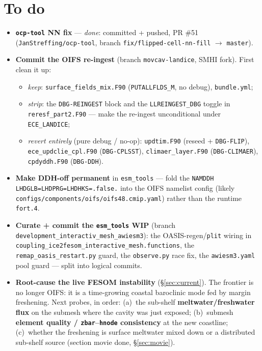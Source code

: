 \documentclass[11pt,a4paper]{article}
\newcommand{\code}[1]{\texttt{\small #1}}
\newcommand{\file}[1]{\texttt{\footnotesize #1}}
\begin{document}
\section{To do}
\begin{itemize}[leftmargin=1.4em,itemsep=2pt]
  \item[$\square$] \textbf{\code{ocp-tool} NN fix} --- \emph{done}: committed + pushed,
        PR \#51 (\code{JanStreffing/ocp-tool}, branch \code{fix/flipped-cell-nn-fill}
        $\to$ \code{master}).
  \item[$\square$] \textbf{Commit the OIFS re-ingest} (branch \code{movcav-landice}, SMHI
        fork). First clean it up:
    \begin{itemize}[leftmargin=1.2em,itemsep=0pt]
      \item \emph{keep}: \file{surface\_fields\_mix.F90} (\code{PUTALLFLDS\_M}, no debug),
            \file{bundle.yml};
      \item \emph{strip}: the \code{DBG-REINGEST} block and the \code{LLREINGEST\_DBG}
            toggle in \file{reresf\_part2.F90} --- make the re-ingest unconditional under
            \code{ECE\_LANDICE};
      \item \emph{revert entirely} (pure debug / no-op): \file{updtim.F90} (reseed +
            \code{DBG-FLIP}), \file{ece\_updclie\_cpl.F90} (\code{DBG-CPLSST}),
            \file{climaer\_layer.F90} (\code{DBG-CLIMAER}), \file{cpdyddh.F90}
            (\code{DBG-DDH}).
    \end{itemize}
  \item[$\square$] \textbf{Make DDH-off permanent} in \code{esm\_tools} --- fold the
        \code{NAMDDH} \code{LHDGLB=LHDPRG=LHDHKS=.false.} into the OIFS namelist config
        (likely \file{configs/components/oifs/oifs48.cmip.yaml}) rather than the runtime
        \file{fort.4}.
  \item[$\square$] \textbf{Curate + commit the \code{esm\_tools} WIP} (branch
        \code{development\_interactiv\_mesh\_awiesm3}): the OASIS-regen/\code{plit} wiring
        in \file{coupling\_ice2fesom\_interactive\_mesh.functions}, the
        \file{remap\_oasis\_restart.py} guard, the \file{observe.py} race fix, the
        \file{awiesm3.yaml} pool guard --- split into logical commits.
  \item[$\square$] \textbf{Root-cause the live FESOM instability} (\S\ref{sec:current}). The
        frontier is no longer OIFS: it is a time-growing coastal baroclinic mode fed by margin
        freshening. Next probes, in order: (a)~the sub-shelf \textbf{meltwater/freshwater flux}
        on the submesh where the cavity was just exposed; (b)~submesh \textbf{element quality /
        \code{zbar}--\code{hnode} consistency} at the new coastline; (c)~whether the freshening
        is surface meltwater mixed down or a distributed sub-shelf source (section movie done,
        \S\ref{sec:movie}).
\end{itemize}
\end{document}
